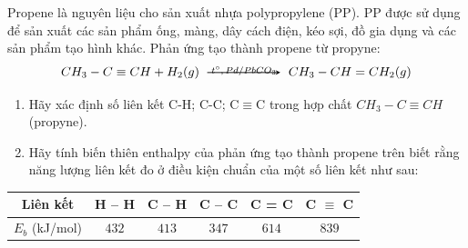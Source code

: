\documentclass[Main.tex]{subfiles}
\begin{document}
\begin{bt}
	Propene là nguyên liệu cho sản xuất nhựa polypropylene (PP). PP được sử dụng để sản xuất các sản phẩm ống, màng, dây cách điện, kéo sợi, đồ gia dụng và các sản phẩm tạo hình khác.
	Phản ứng tạo thành propene từ propyne:
	\[
	CH_3-C \equiv CH + H_2(g) \xrightarrow[$t^\circ, Pd/PbCO_3$] CH_3-CH=CH_2(g)
	\]
	\begin{enumerate}
		\item Hãy xác định số liên kết C-H; C-C; C$\equiv$C trong hợp chất $CH_3-C \equiv CH$ (propyne).
		\item Hãy tính biến thiên enthalpy của phản ứng tạo thành propene trên biết rằng năng lượng liên kết đo ở điều kiện chuẩn của một số liên kết như sau:
	\end{enumerate}
	\begin{tabular}{|c|c|c|c|c|c|}
		\hline
		Liên kết & H – H & C – H & C – C & C = C & C $\equiv$ C \\
		\hline
		$E_b$ (kJ/mol) & $432$ & $413$ & $347$ & $614$ & $839$ \\
		\hline
	\end{tabular}
	
\end{bt}
\end{document}
